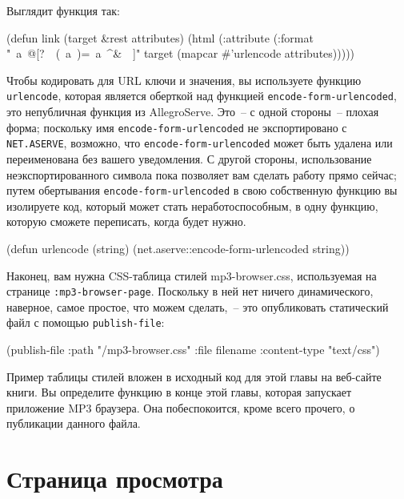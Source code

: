 Выглядит функция так:

\begin{myverb}
(defun link (target &rest attributes)
  (html 
    (:attribute
     (:format "~a~@[?~{~(~a~)=~a~^&~}~]" target (mapcar #'urlencode attributes)))))
\end{myverb}

Чтобы кодировать для URL ключи и значения, вы используете функцию \lstinline{urlencode},
которая является оберткой над функцией \lstinline{encode-form-urlencoded}, это непубличная
функция из AllegroServe. Это~-- с одной стороны~-- плохая форма; поскольку имя
\lstinline{encode-form-urlencoded} не экспортировано с \lstinline{NET.ASERVE}, возможно, что
\lstinline{encode-form-urlencoded} может быть удалена или переименована без вашего уведомления.
С другой стороны, использование неэкспортированного символа пока позволяет вам
сделать работу прямо сейчас; путем обертывания \lstinline{encode-form-urlencoded} в свою
собственную функцию вы изолируете код, который может стать неработоспособным, в одну
функцию, которую сможете переписать, когда будет нужно.

\begin{myverb}
(defun urlencode (string)
  (net.aserve::encode-form-urlencoded string))
\end{myverb}

Наконец, вам нужна CSS-таблица стилей mp3-browser.css, используемая на странице
\lstinline{:mp3-browser-page}. Поскольку в ней нет ничего динамического, наверное, самое
простое, что можем сделать,~-- это опубликовать статический файл с помощью
\lstinline{publish-file}:

\begin{myverb}
(publish-file :path "/mp3-browser.css"  :file filename :content-type "text/css")
\end{myverb}

Пример таблицы стилей вложен в исходный код для этой главы на веб-сайте книги. Вы
определите функцию в конце этой главы, которая запускает приложение MP3 браузера. Она
побеспокоится, кроме всего прочего, о публикации данного файла.

\section{Страница просмотра}

